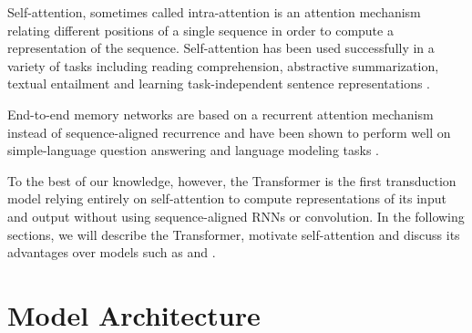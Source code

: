 \documentclass{article}
\begin{document}
Self-attention, sometimes called intra-attention is an attention mechanism relating different positions of a single sequence in order to compute a representation of the sequence. Self-attention has been used successfully in a variety of tasks including reading comprehension, abstractive summarization, textual entailment and learning task-independent sentence representations \citep{cheng2016long, decomposableAttnModel, paulus2017deep, lin2017structured}.

End-to-end memory networks are based on a recurrent attention mechanism instead of sequence-aligned recurrence and have been shown to perform well on simple-language question answering and language modeling tasks \citep{sukhbaatar2015}.

To the best of our knowledge, however, the Transformer is the first transduction model relying entirely on self-attention to compute representations of its input and output without using sequence-aligned RNNs or convolution.
In the following sections, we will describe the Transformer, motivate self-attention and discuss its advantages over models such as \citep{neural_gpu, NalBytenet2017} and \citep{JonasFaceNet2017}.


























%
 
\section{Model Architecture}
\end{document}
